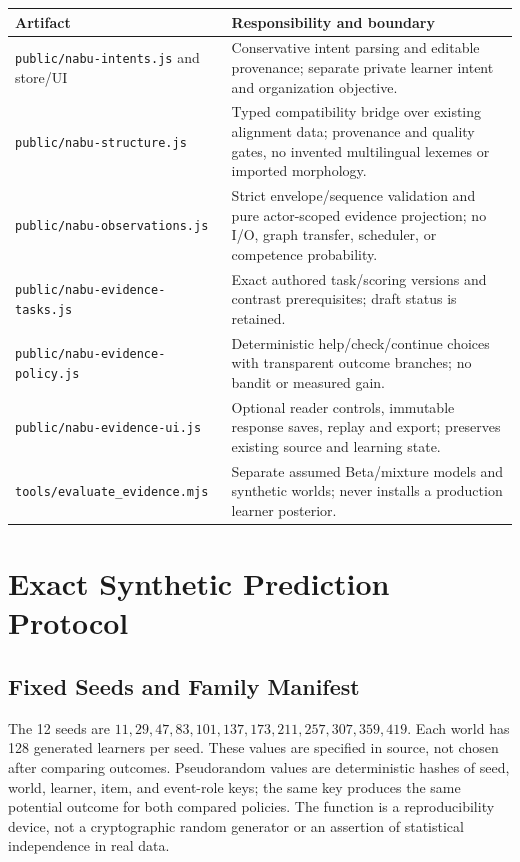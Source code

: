 \documentclass{article}
\newcommand{\artifact}[1]{\nolinkurl{#1}}
\begin{document}
\begin{tabular}{@{}>{\raggedright\arraybackslash}p{}>{\raggedright\arraybackslash}p{}@{}}
\toprule
Artifact & Responsibility and boundary \\
\midrule
\artifact{public/nabu-intents.js} and store/UI & Conservative intent parsing and editable provenance; separate private learner intent and organization objective. \\
\artifact{public/nabu-structure.js} & Typed compatibility bridge over existing alignment data; provenance and quality gates, no invented multilingual lexemes or imported morphology. \\
\artifact{public/nabu-observations.js} & Strict envelope/sequence validation and pure actor-scoped evidence projection; no I/O, graph transfer, scheduler, or competence probability. \\
\artifact{public/nabu-evidence-tasks.js} & Exact authored task/scoring versions and contrast prerequisites; draft status is retained. \\
\artifact{public/nabu-evidence-policy.js} & Deterministic help/check/continue choices with transparent outcome branches; no bandit or measured gain. \\
\artifact{public/nabu-evidence-ui.js} & Optional reader controls, immutable response saves, replay and export; preserves existing source and learning state. \\
\artifact{tools/evaluate_evidence.mjs} & Separate assumed Beta/mixture models and synthetic worlds; never installs a production learner posterior. \\
\bottomrule
\end{tabular}

\section{Exact Synthetic Prediction Protocol}
\label{app:prediction}

\subsection{Fixed Seeds and Family Manifest}

The 12 seeds are $11,29,47,83,101,137,173,211,257,307,359,419$. Each world has 128 generated learners per seed. These values are specified in source, not chosen after comparing outcomes. Pseudorandom values are deterministic hashes of seed, world, learner, item, and event-role keys; the same key produces the same potential outcome for both compared policies. The function is a reproducibility device, not a cryptographic random generator or an assertion of statistical independence in real data.
\end{document}
